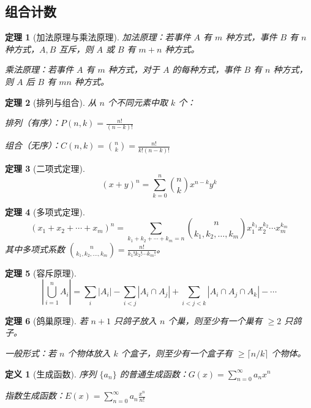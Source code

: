 \documentclass[12pt]{article}
\newtheorem{theorem}{定理}[section]
\newtheorem{definition}{定义}[section]
\begin{document}
\subsection{组合计数}

\begin{theorem}[加法原理与乘法原理]
加法原理：若事件 $A$ 有 $m$ 种方式，事件 $B$ 有 $n$ 种方式，$A, B$ 互斥，则 $A$ 或 $B$ 有 $m + n$ 种方式。

乘法原理：若事件 $A$ 有 $m$ 种方式，对于 $A$ 的每种方式，事件 $B$ 有 $n$ 种方式，则 $A$ 后 $B$ 有 $mn$ 种方式。
\end{theorem}

\begin{theorem}[排列与组合]
从 $n$ 个不同元素中取 $k$ 个：

排列（有序）：$P(n, k) = \frac{n!}{(n-k)!}$

组合（无序）：$C(n, k) = \binom{n}{k} = \frac{n!}{k!(n-k)!}$
\end{theorem}

\begin{theorem}[二项式定理]
$$(x + y)^n = \sum_{k=0}^{n} \binom{n}{k} x^{n-k} y^k$$
\end{theorem}

\begin{theorem}[多项式定理]
$$(x_1 + x_2 + \cdots + x_m)^n = \sum_{k_1 + k_2 + \cdots + k_m = n} \binom{n}{k_1, k_2, \ldots, k_m} x_1^{k_1} x_2^{k_2} \cdots x_m^{k_m}$$
其中多项式系数 $\binom{n}{k_1, k_2, \ldots, k_m} = \frac{n!}{k_1! k_2! \cdots k_m!}$。
\end{theorem}

\begin{theorem}[容斥原理]
$$\left|\bigcup_{i=1}^{n} A_i\right| = \sum_{i} |A_i| - \sum_{i < j} |A_i \cap A_j| + \sum_{i < j < k} |A_i \cap A_j \cap A_k| - \cdots$$
\end{theorem}

\begin{theorem}[鸽巢原理]
若 $n+1$ 只鸽子放入 $n$ 个巢，则至少有一个巢有 $\geq 2$ 只鸽子。

一般形式：若 $n$ 个物体放入 $k$ 个盒子，则至少有一个盒子有 $\geq \lceil n/k \rceil$ 个物体。
\end{theorem}

\begin{definition}[生成函数]
序列 $\{a_n\}$ 的普通生成函数：$G(x) = \sum_{n=0}^{\infty} a_n x^n$

指数生成函数：$E(x) = \sum_{n=0}^{\infty} a_n \frac{x^n}{n!}$
\end{definition}
\end{document}
